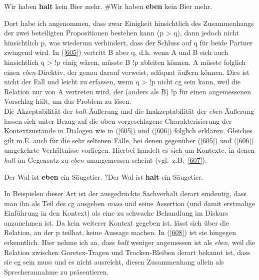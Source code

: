 \begin{exe}
	\ex\label{606} 
		\begin{xlist}	
			\ex\label{606a} Wir haben \textbf{halt} kein Bier mehr.
			\ex\label{606b} \#Wir haben \textbf{eben} kein Bier mehr.
		\end{xlist}
\end{exe}
Dort habe ich angenommen, dass zwar Einigkeit hinsichtlich des Zusammenhangs der zwei beteiligten Propositionen bestehen kann (p > q), dann jedoch nicht hinsichtlich p, was wiederum verhindert, dass der Schluss auf q für beide Partner zwingend wird. In (\ref{605}) vertritt B aber q, d.h. wenn A und B sich auch hinsichtlich q > !p einig wären, müsste B !p ableiten können. A müsste folglich einen \textit{eben}-Direktiv, der genau darauf verweist, adäquat äußern können. Dies ist nicht der Fall und leicht zu erfassen, wenn q > !p nicht cg sein kann, weil die Relation nur von A vertreten wird, der (anders als B) !p für einen angemessenen Vorschlag hält, um das Problem zu lösen.\\
\newline
Die Akzeptabilität der \textit{halt}-Äußerung und die Inakzeptabilität der \textit{eben}-Äuße\-rung lassen sich unter Bezug auf die oben vorgeschlagene Charakterisierung der Kontextzustände in Dialogen wie in (\ref{605}) und (\ref{606}) folglich erklären. Gleiches gilt m.E. auch für die sehr seltenen Fälle, bei denen gegenüber (\ref{605}) und (\ref{606}) umgekehrte Verhältnisse vorliegen. Hierbei handelt es sich um Kontexte, in denen \textit{halt} im Gegensatz zu \textit{eben} unangemessen scheint (vgl.\ z.B.\ \ref{607}).
	
\begin{exe}
	\ex\label{607} 
		\begin{xlist}	
			\ex\label{607a} Der Wal ist \textbf{eben} ein Säugetier.
			\ex\label{607b} ?Der Wal ist \textbf{halt} ein Säugetier.
		\end{xlist}
\end{exe}	
In Beispielen dieser Art ist der ausgedrückte Sachverhalt derart eindeutig, dass man ihn als Teil des cg ausgeben \emph{muss} und seine Assertion (und damit erstmalige Einführung in den Kontext) als eine zu schwache Behandlung im Diskurs anzunehmen ist. Da kein weiterer Kontext gegeben ist, lässt sich über die Relation, an der p teilhat, keine Aussage machen. In (\ref{608}) ist sie hingegen erkenntlich. Hier nehme ich an, dass \textit{halt} weniger angemessen ist als \textit{eben}, weil die Relation zwischen Goretex-Tragen und Trocken-Bleiben derart bekannt ist, dass sie cg sein muss und es nicht ausreicht, diesen Zusammenhang allein als Sprecherannahme zu präsentieren.

